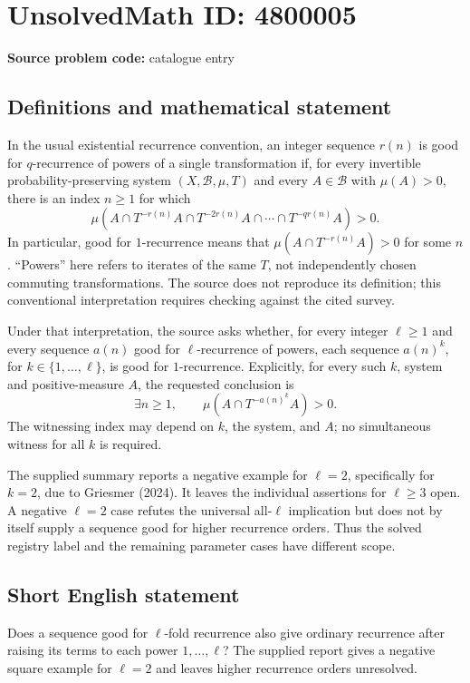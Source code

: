 \documentclass[11pt]{article}
\begin{document}
\section*{UnsolvedMath ID: 4800005}
\textbf{Source problem code:} catalogue entry
\subsection{Definitions and mathematical statement}
In the usual existential recurrence convention, an integer sequence $r(n)$ is good for $q$-recurrence of powers of a single transformation if, for every invertible probability-preserving system $(X,\mathcal B,\mu,T)$ and every $A\in\mathcal B$ with $\mu(A)>0$, there is an index $n\geq1$ for which
\[
\mu\left(A\cap T^{-r(n)}A\cap T^{-2r(n)}A\cap\cdots\cap T^{-qr(n)}A\right)>0.
\]
In particular, good for $1$-recurrence means that $\mu(A\cap T^{-r(n)}A)>0$ for some $n$. ``Powers'' here refers to iterates of the same $T$, not independently chosen commuting transformations. The source does not reproduce its definition; this conventional interpretation requires checking against the cited survey.

Under that interpretation, the source asks whether, for every integer $\ell\geq1$ and every sequence $a(n)$ good for $\ell$-recurrence of powers, each sequence $a(n)^k$, for $k\in\{1,\ldots,\ell\}$, is good for $1$-recurrence. Explicitly, for every such $k$, system and positive-measure $A$, the requested conclusion is
\[
\exists n\geq1,\qquad \mu(A\cap T^{-a(n)^k}A)>0.
\]
The witnessing index may depend on $k$, the system, and $A$; no simultaneous witness for all $k$ is required.

The supplied summary reports a negative example for $\ell=2$, specifically for $k=2$, due to Griesmer (2024). It leaves the individual assertions for $\ell\geq3$ open. A negative $\ell=2$ case refutes the universal all-$\ell$ implication but does not by itself supply a sequence good for higher recurrence orders. Thus the solved registry label and the remaining parameter cases have different scope.
\subsection{Short English statement}
Does a sequence good for $\ell$-fold recurrence also give ordinary recurrence after raising its terms to each power $1,\ldots,\ell$? The supplied report gives a negative square example for $\ell=2$ and leaves higher recurrence orders unresolved.
\end{document}
